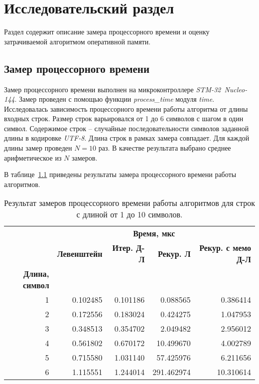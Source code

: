 \chapter{Исследовательский раздел}
Раздел содержит описание замера процессорного времени и оценку затрачиваемой    алгоритмом оперативной памяти.

\section{Замер процессорного времени}
Замер процессорного времени выполнен на микроконтроллере \textit{STM-32~Nucleo-144}.
Замер проведен с помощью функции \textit{process\_time} модуля \textit{time}. Исследовалась зависимость процессорного времени работы алгоритма от длины входных строк. Размер строк варьировался от 1 до 6 символов с шагом в один символ. Содержимое строк -- случайные последовательности символов заданной длины в кодировке \textit{UTF-8}. Длина строк в рамках замера совпадает. Для каждой длины замер проведен $N=10$ раз. В качестве результата выбрано среднее арифметическое из $N$ замеров.

В таблице~\ref{tbl:time} приведены результаты замера процессорного времени работы алгоритмов.

\begin{table}[ht]
	\small
	\begin{center}
			\caption{Результат замеров процессорного времени работы алгоритмов для строк с длиной от 1 до 10 символов.}
			\label{tbl:time}
			\begin{tabular}{|r|r|r|r|r|}
				\hline
				& \multicolumn{4}{c|}{\bfseries Время, мкс} \\ \cline{2-5}
				& \bfseries Левенштейн
				& \bfseries Итер. Д-Л 
				& \bfseries Рекур. Л 
				& \bfseries Рекур. с мемо Д-Л \\
				\hline
				\bfseries Длина, символ & & & & \\
				\hline
				1 & 0.102485 & 0.101186 & 0.088565 & 0.386414 \\
				\hline
				2 & 0.172556 & 0.183024 & 0.424275 & 1.047953 \\
				\hline
				3 & 0.348513 & 0.354702 & 2.049482 & 2.956012 \\
				\hline
				4 & 0.561802 & 0.670172 & 10.499670 & 4.002789 \\
				\hline
				5 & 0.715580 & 1.031140 & 57.425976 & 6.211656 \\
				\hline
				6 & 1.115551 & 1.244014 & 291.462974 & 10.310614 \\
				\hline
			\end{tabular}
	\end{center}
\end{table}

